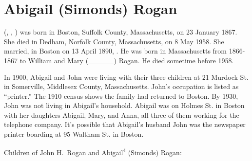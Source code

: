 \section{Abigail (Simonds) Rogan}

 (, , ) was born in Boston, Suffolk County, Massachusetts, on 23 January 1867.\cite{Abigail4SimondsBirth} She died in Dedham, Norfolk County, Massachusetts, on 8 May 1958.\cite{Abigail4SimondsDeath} She married, in Boston on 13 April 1890, . He was born in Massachusetts from 1866-1867 to William and Mary (\_\_\_\_\_) Rogan.\cite{Census1880JohnRogan} He died sometime before 1958.\cite{Abigail4SimondsDeath}

In 1900, Abigail and John were living with their three children at 21 Murdock St. in Somerville, Middlesex County, Massachusetts. John's occupation is listed as ``printer.''\cite{Census1900AbigailSimonds} The 1910 census shows the family had returned to Boston.\cite{Census1910AbigailSimonds} By 1930, John was not living in Abigail's household. Abigail was on Holmes St. in Boston with her daughters Abigail, Mary, and Anna, all three of them working for the telephone company.\cite{Census1930AbigailSimonds} It's possible that Abigail's husband John was the newspaper printer boarding at 95 Waltham St. in Boston.\cite{Census1930JohnRogan}

\begin{KidsIntro}
	Children of John H.\ Rogan and Abigail\textsuperscript{4} (Simonds) Rogan:
\end{KidsIntro}

